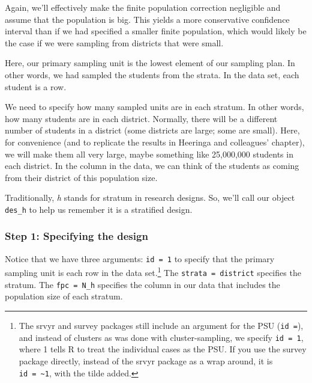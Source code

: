 \documentclass[
]{article}
\newenvironment{Shaded}{\begin{snugshade}}{\end{snugshade}}
\newcommand{\DecValTok}[1]{\textcolor[rgb]{0.00,0.00,0.81}{#1}}
\newcommand{\NormalTok}[1]{#1}
\newcommand{\OperatorTok}[1]{\textcolor[rgb]{0.81,0.36,0.00}{\textbf{#1}}}
\newcommand{\StringTok}[1]{\textcolor[rgb]{0.31,0.60,0.02}{#1}}
\begin{document}
Again, we'll effectively make the finite population correction negligible and assume that the population is big. This yields a more conservative confidence interval than if we had specified a smaller finite population, which would likely be the case if we were sampling from districts that were small.

Here, our primary sampling unit is the lowest element of our sampling plan. In other words, we had sampled the students from the strata. In the data set, each student is a row.

We need to specify how many sampled units are in each stratum. In other words, how many students are in each district. Normally, there will be a different number of students in a district (some districts are large; some are small). Here, for convenience (and to replicate the results in Heeringa and colleagues' chapter), we will make them all very large, maybe something like 25,000,000 students in each district. In the column in the data, we can think of the students as coming from their district of this population size.

Traditionally, \emph{h} stands for stratum in research designs. So, we'll call our object \texttt{des\_h} to help us remember it is a stratified design.

\begin{Shaded}
\end{Shaded}

\hypertarget{step-1-specifying-the-design-1}{%
\subsubsection{Step 1: Specifying the design}\label{step-1-specifying-the-design-1}}

Notice that we have three arguments: \texttt{id\ =\ 1} to specify that the primary sampling unit is each row in the data set.\footnote{The srvyr and survey packages still include an argument for the PSU (\texttt{id\ =}), and instead of clusters as was done with cluster-sampling, we specify \texttt{id\ =\ 1}, where 1 tells R to treat the individual cases as the PSU. If you use the survey package directly, instead of the srvyr package as a wrap around, it is \texttt{id\ =\ \textasciitilde{}1}, with the tilde added.} The \texttt{strata\ =\ district} specifies the stratum. The \texttt{fpc\ =\ N\_h} specifies the column in our data that includes the population size of each stratum.
\end{document}
